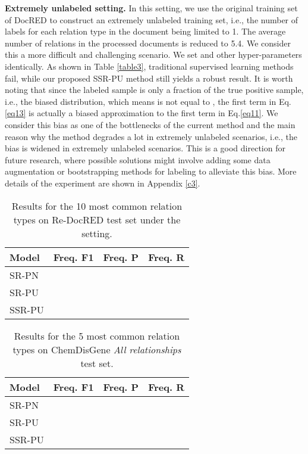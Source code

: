 \documentclass[11pt]{article}
\begin{document}
\textbf{Extremely unlabeled setting.} \enspace In this setting, we use the original training set of DocRED to construct an extremely unlabeled training set, i.e., the number of labels for each relation type in the document being limited to 1. The average number of relations in the processed documents is reduced to 5.4. We consider this a more difficult and challenging scenario. We set  and other hyper-parameters identically. As shown in Table \ref{table3}, traditional supervised learning methods fail, while our proposed SSR-PU method still yields a robust result. It is worth noting that since the labeled sample is only a fraction of the true positive sample, i.e., the biased distribution, which means  is not equal to , the first term in Eq.\ref{eq13} is actually a biased approximation to the first term in Eq.\ref{eq11}. We consider this bias as one of the bottlenecks of the current method and the main reason why the method degrades a lot in extremely unlabeled scenarios, i.e., the bias is widened in extremely unlabeled scenarios. This is a good direction for future research, where possible solutions might involve adding some data augmentation or bootstrapping methods for labeling to alleviate this bias. More details of the experiment are shown in Appendix \ref{c3}.

\begin{table}
\centering
\begin{tabular}{lccc}
\hline \textbf{Model} & \textbf{Freq. F1} & \textbf{Freq. P} & \textbf{Freq. R} \\
\hline
SR-PN &  &  &  \\
SR-PU &  &  &  \\
SSR-PU &  &  &  \\
\hline
\end{tabular}
\caption{\label{table_common1}
Results for the 10 most common relation types on Re-DocRED test set under the  setting.
}
\end{table}

\begin{table}
\centering
\begin{tabular}{lccc}
\hline \textbf{Model} & \textbf{Freq. F1} & \textbf{Freq. P} & \textbf{Freq. R} \\
\hline
SR-PN &  &  &  \\
SR-PU &  &  &  \\
SSR-PU &  &  &  \\
\hline
\end{tabular}
\caption{\label{table_common2}
Results for the 5 most common relation types on ChemDisGene \emph{All relationships} test set. 
}
\end{table}
\end{document}
